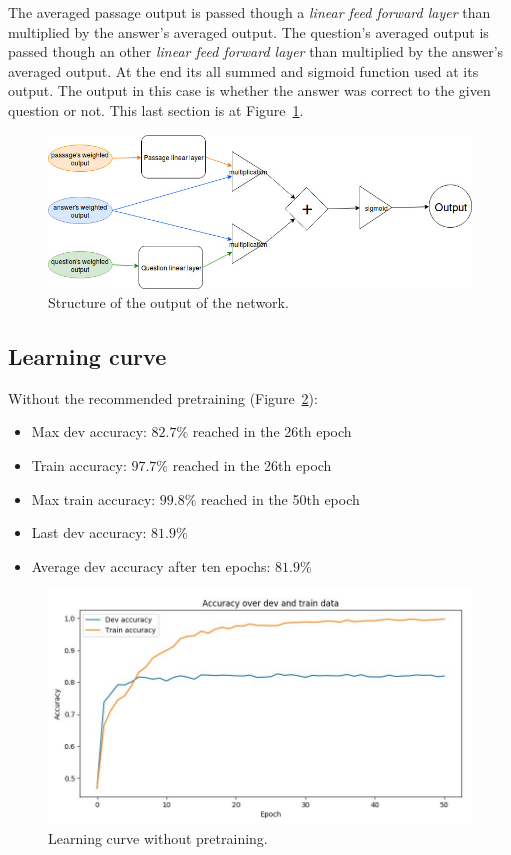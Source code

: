 The averaged passage output is passed though a \textit{linear feed forward layer} than multiplied by the answer's averaged output. The question's averaged output is passed though an other \textit{linear feed forward layer} than multiplied by the answer's averaged output. At the end its all summed and sigmoid function used at its output. The output in this case is whether the answer was correct to the given question or not. This last section is at Figure~\ref{fig:output}.
\begin{figure}[!htb]
	\centering
	\includegraphics[scale=0.5]{TriAN_output.jpg}
	\caption{Structure of the output of the network.}
	\label{fig:output}
\end{figure}

\subsection{Learning curve}
\begin{minipage}{\linewidth}
Without the recommended pretraining (Figure~\ref{fig:learning_curve}):
\begin{itemize}
	\item Max dev accuracy: $82.7\%$ reached in the 26th epoch
	\item Train accuracy: $97.7\%$ reached in the 26th epoch
	\item Max train accuracy: $99.8\%$ reached in the 50th epoch
	\item Last dev accuracy: $81.9\%$
	\item Average dev accuracy after ten epochs: $81.9\%$
\end{itemize}
\end{minipage}
\begin{figure}[!htb]
	\centering
	\includegraphics[scale=0.5]{learning_curve.jpg}
	\caption{Learning curve without pretraining.}
	\label{fig:learning_curve}
\end{figure}

